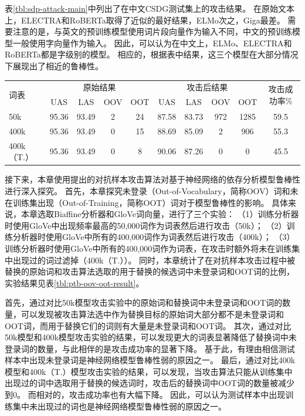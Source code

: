 表\ref{tbl:sdp-attack-main}中列出了在中文CSDG测试集上的攻击结果。
在原始文本上，ELECTRA和RoBERTa取得了近似的最好结果，ELMo次之，Giga最差。
需要注意的是，与英文的预训练模型使用词片段向量作为输入不同，中文的预训练模型一般使用字向量作为输入。
因此，可以认为在中文上，ELMo、ELECTRA和RoBERTa都是字级别的模型。
相应的，根据表中结果，这三个模型在大部分情况下展现出了相近的鲁棒性。


\begin{table}[ht]
    \vspace{0.5em}\centering\wuhao
	\begin{tabular}{lccccccccc}
		\toprule[1.5pt]
		\multirow{2}{*}{词表}& \multicolumn{4}{c}{原始结果} & \multicolumn{4}{c}{攻击后结果} & \multirow{2}{*}{攻击成功率\%} \\
		\cmidrule(r){2-5} \cmidrule(r){6-9}
		&UAS &LAS &OOV &OOT &UAS &LAS &OOV &OOT \\
		\midrule[1pt]
		50k  &95.36 &93.49 &2  &24 &87.58 &83.73 &972 &1285 &59.5 \\
		400k &95.36 &93.49 &0  &15 &88.69 &85.09 &2       &906  &55.3 \\
		400k（T.） &95.36 &93.49 &0  &8  &90.06 &87.26 &0 &0 &45.5 \\
		\bottomrule[1.5pt]
	\end{tabular}
\end{table}


接下来，本章使用提出的对抗样本攻击算法对基于神经网络的依存分析模型鲁棒性进行深入探究。
首先，本章探究未登录（Out-of-Vocabulary，简称OOV）词和未在训练集出现（Out-of-Training，简称OOT）词对于模型鲁棒性的影响。
具体来说，本章选取Biaffine分析器和GloVe词向量，进行了三个实验：
（1）训练分析器时使用GloVe中出现频率最高的50,000词作为词表然后进行攻击（50k）；
（2）训练分析器时使用GloVe中所有的400,000词作为词表然后进行攻击（400k）；
（3）训练分析器时使用GloVe中所有的400,000词作为词表，在攻击时额外将未在训练集中出现过的词过滤掉（400k（T.））。
同时，本章统计了在对抗样本攻击过程中被替换的原始词和攻击算法选取的用于替换的候选词中未登录词和OOT词的比例，实验结果见表\ref{tbl:ptb-oov-oot-result}。

首先，通过对比50k模型攻击实验中的原始词和替换词中未登录词和OOT词的数量，可以发现被攻击算法选中作为替换目标的原始词大部分都不是未登录词和OOT词，而用于替换它们的词则有大量是未登录词和OOT词。
其次，通过对比50k模型和400k模型攻击实验的结果，可以发现更大的词表显著降低了替换词中未登录词的数量，与此相伴的是攻击成功率的显著下降。
基于此，有理由相信测试样本中出现未登录词是神经网络模型鲁棒性弱的原因之一。
最后，通过对比400k模型和400k（T.）模型攻击实验的结果，可以发现，当攻击算法只能从训练集中出现过的词中选取用于替换的候选词时，攻击后的替换词中OOT词的数量被减少到0。
而相对的，攻击成功率也有大幅下降。
因此，可以认为测试样本中出现训练集中未出现过的词也是神经网络模型鲁棒性弱的原因之一。

